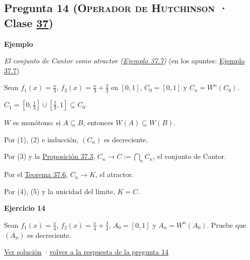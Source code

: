 \documentclass[11pt,a4paper]{article}
\newcommand{\bloque}[1]{\par\smallskip\noindent\textbf{\color{acento}#1}\par}
\begin{document}
\subsection*{\hypertarget{e-14}{}Pregunta 14 \normalfont\small(\textsc{Operador de Hutchinson} · Clase \href{https://decostruttivismo.github.io/MAT2514-repaso/pdf/MAT2514_apuntes_completos.pdf\#nameddest=section.37}{37})}
\bloque{Ejemplo}
\textit{El conjunto de Cantor como atractor (\href{https://decostruttivismo.github.io/MAT2514-repaso/pdf/MAT2514_apuntes_completos.pdf\#nameddest=teorema.37.7}{Ejemplo 37.7})} {\small(en los apuntes: \href{https://decostruttivismo.github.io/MAT2514-repaso/pdf/MAT2514_apuntes_completos.pdf\#nameddest=teorema.37.7}{Ejemplo 37.7})}
\begin{pasos}
\item[] Sean $f_1(x)=\frac x3$, $f_2(x)=\frac x3+\frac23$ en $[0,1]$, $C_0=[0,1]$ y $C_n=W^n(C_0)$.
\item[(1)] $C_1=[0,\frac13]\cup[\frac23,1]\subseteq C_0$.
\item[(2)] $W$ es monótono: si $A\subseteq B$, entonces $W(A)\subseteq W(B)$.
\item[(3)] Por (1), (2) e inducción, $(C_n)$ es decreciente.
\item[(4)] Por (3) y la \href{https://decostruttivismo.github.io/MAT2514-repaso/pdf/MAT2514_apuntes_completos.pdf\#nameddest=teorema.37.3}{Proposición 37.3}, $C_n\to C:=\bigcap_nC_n$, el conjunto de Cantor.
\item[(5)] Por el \href{https://decostruttivismo.github.io/MAT2514-repaso/pdf/MAT2514_apuntes_completos.pdf\#nameddest=teorema.37.6}{Teorema 37.6}, $C_n\to K$, el atractor.
\item[] Por (4), (5) y la unicidad del límite, $K=C$.
\end{pasos}
\bloque{\hypertarget{x-14}{}Ejercicio 14}
Sean $f_1(x)=\frac x4$, $f_2(x)=\frac x4+\frac34$, $A_0=[0,1]$ y $A_n=W^n(A_0)$. Pruebe que $(A_n)$ es decreciente.
\par{\small \hyperlink{s-14}{Ver solución} \quad·\quad \hyperlink{r-14}{volver a la respuesta de la pregunta 14}}
\end{document}
